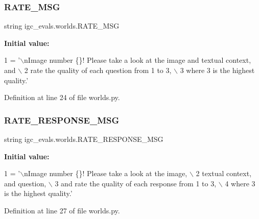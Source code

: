 \subsubsection{\texorpdfstring{R\+A\+T\+E\+\_\+\+M\+SG}{RATE\_MSG}}
{\footnotesize\ttfamily string igc\+\_\+evals.\+worlds.\+R\+A\+T\+E\+\_\+\+M\+SG}

{\bfseries Initial value\+:}
\begin{DoxyCode}
1 =  \textcolor{stringliteral}{'\(\backslash\)nImage number \{\}! Please take a look at the image and textual context, and \(\backslash\)}
2 \textcolor{stringliteral}{            rate the quality of each question from 1 to 3, \(\backslash\)}
3 \textcolor{stringliteral}{            where 3 is the highest quality.'}
\end{DoxyCode}


Definition at line 24 of file worlds.\+py.

\mbox{\label{namespaceigc__evals_1_1worlds_a636a949f86f1ea5febabe8bf4e744e82}} 
\subsubsection{\texorpdfstring{R\+A\+T\+E\+\_\+\+R\+E\+S\+P\+O\+N\+S\+E\+\_\+\+M\+SG}{RATE\_RESPONSE\_MSG}}
{\footnotesize\ttfamily string igc\+\_\+evals.\+worlds.\+R\+A\+T\+E\+\_\+\+R\+E\+S\+P\+O\+N\+S\+E\+\_\+\+M\+SG}

{\bfseries Initial value\+:}
\begin{DoxyCode}
1 =  \textcolor{stringliteral}{'\(\backslash\)nImage number \{\}! Please take a look at the image, \(\backslash\)}
2 \textcolor{stringliteral}{                    textual context, and question, \(\backslash\)}
3 \textcolor{stringliteral}{                    and rate the quality of each response from 1 to 3, \(\backslash\)}
4 \textcolor{stringliteral}{                    where 3 is the highest quality.'}
\end{DoxyCode}


Definition at line 27 of file worlds.\+py.

\mbox{\label{namespaceigc__evals_1_1worlds_a6621760cfa1df3bc36a783ba4feecf33}} 
